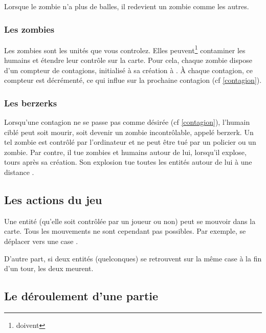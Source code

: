 Lorsque le zombie n'a plus de balles, il redevient un zombie comme les autres.



\subsubsection{Les zombies} %
Les zombies sont les unités que vous controlez.
Elles peuvent\footnote{doivent} contaminer les humains et étendre leur contrôle sur la carte.
Pour cela, chaque zombie dispose d'un compteur de contagions, initialisé à sa création à \contagionamount.
À chaque contagion, ce compteur est décrémenté, ce qui influe sur la prochaine contagion (cf \ref{contagion}).



\subsubsection{Les berzerks} %
Lorsqu'une contagion ne se passe pas comme désirée (cf \ref{contagion}), l'humain ciblé peut soit mourir, soit devenir un zombie incontrôlable, appelé berzerk.
Un tel zombie est contrôlé par l'ordinateur et ne peut être tué par un policier ou un zombie.
Par contre, il tue zombies et humains autour de lui, lorsqu'il explose, \berzerkdelay{} tours après sa création.
Son explosion tue toutes les entités autour de lui à une distance \berzerkradius{}.



\subsection{Les actions du jeu} %
Une entité (qu'elle soit contrôlée par un joueur ou non) peut se mouvoir dans la carte.
Tous les mouvements ne sont cependant pas possibles. Par exemple, se déplacer vers une case \water.

D'autre part, si deux entités (quelconques) se retrouvent sur la même case à la fin d'un tour, les deux meurent.


\subsection{Le déroulement d'une partie} %

